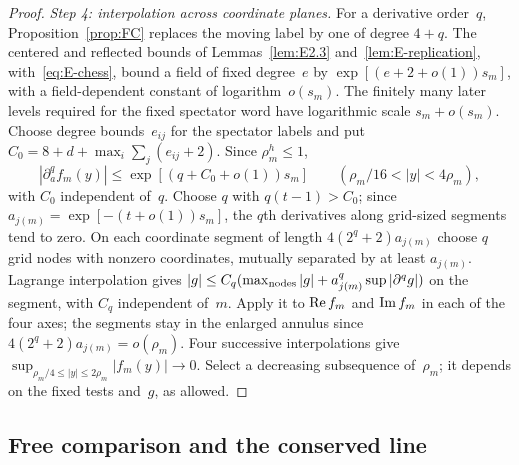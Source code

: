 \begin{proof}
\emph{Step 4: interpolation across coordinate planes.} For a derivative order~$q$, Proposition~\ref{prop:FC} replaces the moving label by one of degree $4+q$. The centered and reflected bounds of Lemmas~\ref{lem:E2.3} and~\ref{lem:E-replication}, with~\eqref{eq:E-chess}, bound a field of fixed degree~$e$ by $\exp[(e+2+o(1))s_m]$, with a field-dependent constant of logarithm~$o(s_m)$. The finitely many later levels required for the fixed spectator word have logarithmic scale $s_m+o(s_m)$. Choose degree bounds~$e_{ij}$ for the spectator labels and put $C_0=8+d+\max_i\sum_j(e_{ij}+2)$. Since $\rho_m^h\le1$,
\begin{equation}\label{eq:G-annular-derivatives}
|\partial_a^q f_m(y)|\le \exp[(q+C_0+o(1))s_m]
\qquad(\rho_m/16<|y|<4\rho_m),
\end{equation}
with $C_0$ independent of~$q$. Choose $q$ with $q(t-1)>C_0$; since $a_{j(m)}=\exp[-(t+o(1))s_m]$, the $q$th derivatives along grid-sized segments tend to zero. On each coordinate segment of length $4(2^q+2)a_{j(m)}$ choose $q$ grid nodes with nonzero coordinates, mutually separated by at least $a_{j(m)}$. Lagrange interpolation gives $|g|\le C_q(\max_{\rm nodes}|g|+a_{j(m)}^q\sup|\partial^qg|)$ on the segment, with $C_q$ independent of~$m$. Apply it to ${\rm Re}\,f_m$ and ${\rm Im}\,f_m$ in each of the four axes; the segments stay in the enlarged annulus since $4(2^q+2)a_{j(m)}=o(\rho_m)$. Four successive interpolations give $\sup_{\rho_m/4\le|y|\le2\rho_m}|f_m(y)|\to0$. Select a decreasing subsequence of~$\rho_m$; it depends on the fixed tests and~$g$, as allowed.
\end{proof}

\subsection{Free comparison and the conserved line}\label{sec:partII-G.2}

